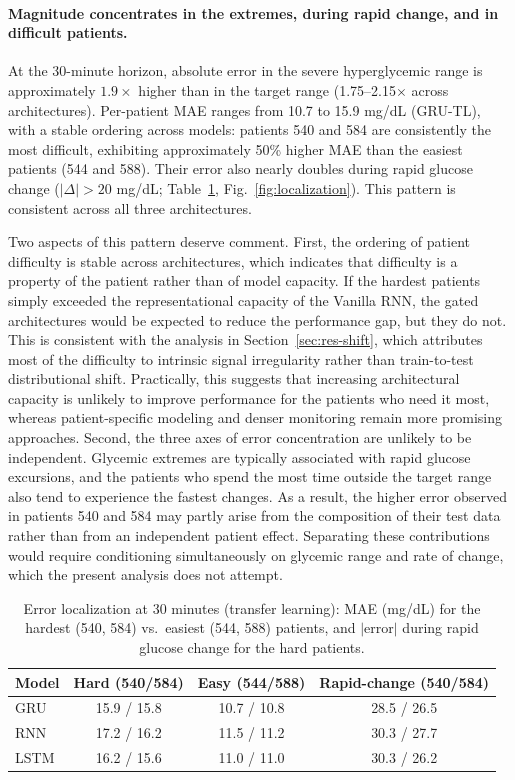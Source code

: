 \documentclass[conference]{IEEEtran}
\begin{document}
\paragraph{Magnitude concentrates in the extremes, during rapid change, and in difficult patients.} At the 30-minute horizon, absolute error in the severe hyperglycemic range is approximately $1.9\times$ higher than in the target range (1.75--2.15$\times$ across architectures). Per-patient MAE ranges from 10.7 to 15.9 mg/dL (GRU-TL), with a stable ordering across models: patients 540 and 584 are consistently the most difficult, exhibiting approximately 50\% higher MAE than the easiest patients (544 and 588). Their error also nearly doubles during rapid glucose change ($|\Delta|>20$ mg/dL; Table~\ref{tab:localization}, Fig.~\ref{fig:localization}). This pattern is consistent across all three architectures.

Two aspects of this pattern deserve comment. First, the ordering of patient
difficulty is stable across architectures, which indicates that difficulty is a
property of the patient rather than of model capacity. If the hardest patients simply exceeded the representational capacity of the Vanilla RNN, the gated architectures would be expected to reduce the performance gap, but they do not. This is consistent with the analysis in Section~\ref{sec:res-shift}, which attributes most of the difficulty to intrinsic signal irregularity rather than train-to-test distributional shift. Practically, this suggests that increasing architectural capacity is unlikely to improve performance for the patients who need it most, whereas patient-specific modeling and denser monitoring remain more promising approaches.
Second, the three axes of error concentration are unlikely to be independent. Glycemic extremes are typically associated with rapid glucose excursions, and the patients who spend the most time outside the target range also tend to experience the fastest changes. As a result, the higher error observed in patients 540 and 584 may partly arise from the composition of their test data rather than from an independent patient effect. Separating these contributions would require conditioning simultaneously on glycemic range and rate of change, which the present analysis does not attempt.


\begin{table}[t]
\centering
\caption{Error localization at 30 minutes (transfer learning): MAE (mg/dL) for the
hardest (540, 584) vs.\ easiest (544, 588) patients, and $|$error$|$ during rapid
glucose change for the hard patients.}
\label{tab:localization}
\small
\begin{tabular}{@{}lccc@{}}
\toprule
Model & Hard (540/584) & Easy (544/588) & Rapid-change (540/584) \\
\midrule
GRU  & 15.9 / 15.8 & 10.7 / 10.8 & 28.5 / 26.5 \\
RNN  & 17.2 / 16.2 & 11.5 / 11.2 & 30.3 / 27.7 \\
LSTM & 16.2 / 15.6 & 11.0 / 11.0 & 30.3 / 26.2 \\
\bottomrule
\end{tabular}
\end{table}
\end{document}
